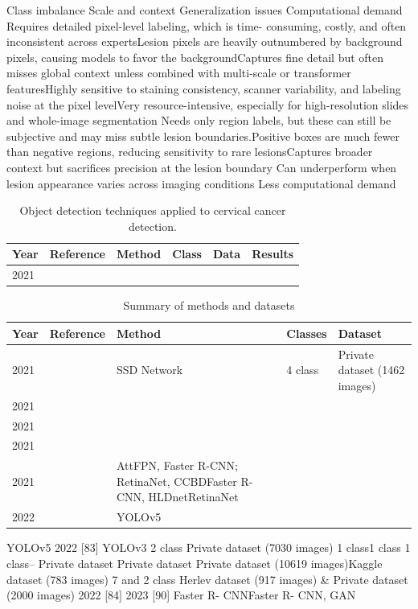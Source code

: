 \documentclass{svjour3}
\begin{document}
Class imbalance
Scale and context
Generalization 
issues
Computational 
demand
Requires detailed pixel-level labeling, which is time- consuming, costly, and often inconsistent across expertsLesion pixels are heavily outnumbered by background pixels, causing models to favor the backgroundCaptures fine detail but often misses global context unless combined with multi-scale or transformer featuresHighly sensitive to staining consistency, scanner variability, and labeling noise at the pixel levelVery resource-intensive, especially for high-resolution slides and whole-image segmentation
Needs only region labels, but these can still be subjective and may miss subtle lesion boundaries.Positive boxes are much fewer than negative regions, reducing sensitivity to rare lesionsCaptures broader context but sacrifices precision at the lesion boundary
Can underperform when lesion appearance varies across imaging conditions
Less computational demand
\begin{table}[htbp]
\centering
\caption{Object detection techniques applied to cervical cancer detection.}
\label{tab:object-detection}
\begin{tabular}{llllll}
\hline
Year & Reference & Method & Class & Data & Results \\
\hline
2021 & & & & & \\
\hline
\end{tabular}
\end{table}

\begin{table}[htbp]
\centering
\caption{Summary of methods and datasets}
\label{tab:summary}
\begin{tabular}{l l l l l}
\hline
Year & Reference & Method & Classes & Dataset \\
\hline
2021 & \cite{ref85} & SSD Network & 4 class & Private dataset (1462 images) \\
2021 & \cite{ref86} & & & \\
2021 & \cite{ref87} & & & \\
2021 & \cite{ref88} & & & \\
2021 & \cite{ref33} & AttFPN, Faster R-CNN; RetinaNet, CCBDFaster R-CNN, HLDnetRetinaNet & & \\
2022 & \cite{ref89} & YOLOv5 & & \\
\hline
\end{tabular}
\end{table}

YOLOv5
2022
[83]
YOLOv3
2 class
Private dataset (7030 images)
1 class1 class
1 class–
Private dataset
Private dataset
Private dataset (10619 images)Kaggle dataset (783 images)
7 and 2 class
Herlev dataset (917 images) \& Private dataset (2000 images)
2022
[84]
2023
[90]
Faster R- CNNFaster R- CNN, GAN
\end{document}

